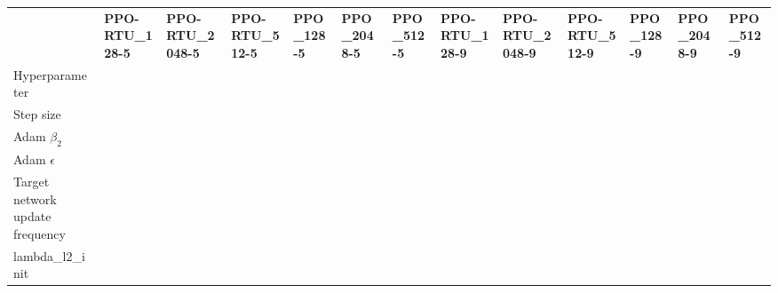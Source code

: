 \begin{tabular}{lllllllllllll}
 & \bfseries PPO-RTU_128-5 & \bfseries PPO-RTU_2048-5 & \bfseries PPO-RTU_512-5 & \bfseries PPO_128-5 & \bfseries PPO_2048-5 & \bfseries PPO_512-5 & \bfseries PPO-RTU_128-9 & \bfseries PPO-RTU_2048-9 & \bfseries PPO-RTU_512-9 & \bfseries PPO_128-9 & \bfseries PPO_2048-9 & \bfseries PPO_512-9 \\
Hyperparameter &  &  &  &  &  &  &  &  &  &  &  &  \\
Step size &  &  &  &  &  &  &  &  &  &  &  &  \\
Adam $\beta_2$ &  &  &  &  &  &  &  &  &  &  &  &  \\
Adam $\epsilon$ &  &  &  &  &  &  &  &  &  &  &  &  \\
Target network update frequency &  &  &  &  &  &  &  &  &  &  &  &  \\
lambda_l2_init &  &  &  &  &  &  &  &  &  &  &  &  \\
\end{tabular}
